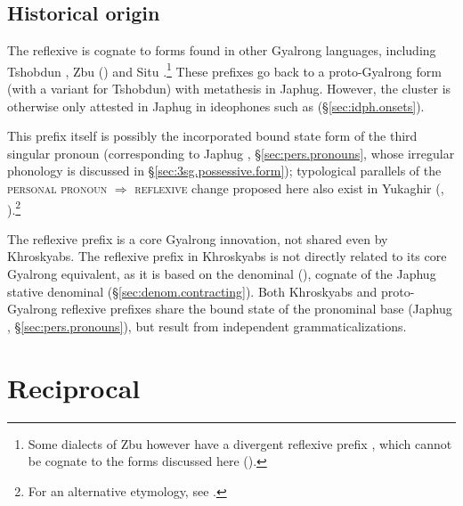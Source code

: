  
\subsection{Historical origin}  \label{sec:reflexive.origin}
   
The reflexive  is cognate to forms found in other Gyalrong languages, including Tshobdun  \citep{jackson14morpho}, Zbu  (\citealt[9]{gong18these}) and Situ .\footnote{Some dialects of Zbu however have a divergent reflexive prefix , which cannot be cognate to the forms discussed here (\citealt[9]{gong18these}). } These prefixes go back to a proto-Gyalrong form  (with a variant  for Tshobdun) with metathesis in Japhug. However, the cluster  is otherwise only attested in Japhug in ideophones such as  (§\ref{sec:idph.onsets}).

This prefix itself is possibly the incorporated bound state form of the third singular pronoun  (corresponding to Japhug , §\ref{sec:pers.pronouns}, whose irregular phonology is discussed in §\ref{sec:3sg.possessive.form}); typological parallels of the \textsc{personal pronoun} $\Rightarrow$ \textsc{reflexive} change proposed here also exist in Yukaghir (\citealt{jacques10refl}, \citealt[§5.2]{maslova07yukaghir}).\footnote{For an alternative etymology, see \citet{jackson14morpho}.}
 
The reflexive prefix is a core Gyalrong innovation, not shared even by Khroskyabs. The reflexive prefix  in Khroskyabs is not directly related to its core Gyalrong equivalent, as it is based on the denominal  (\citealt[300]{lai17khroskyabs}), cognate of the Japhug stative denominal  (§\ref{sec:denom.contracting}). Both Khroskyabs  and proto-Gyalrong  reflexive prefixes share the bound state of the pronominal base  (Japhug , §\ref{sec:pers.pronouns}), but result from independent grammaticalizations.

\section{Reciprocal} \label{sec:reciprocal}

